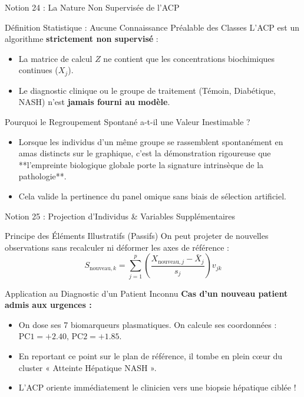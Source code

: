 \documentclass[aspectratio=169,10pt]{beamer}
\begin{document}
\begin{frame}{Notion 24 : La Nature Non Supervisée de l'ACP}
  \begin{conceptbox}{Définition Statistique : Aucune Connaissance Préalable des Classes}
    \footnotesize
    L'ACP est un algorithme \textbf{strictement non supervisé} :
    \begin{itemize}
      \item La matrice de calcul $Z$ ne contient que les concentrations biochimiques continues ($X_j$).
      \item Le diagnostic clinique ou le groupe de traitement (Témoin, Diabétique, NASH) n'est \textbf{jamais fourni au modèle}.
    \end{itemize}
  \end{conceptbox}
  \vspace{1mm}
  \begin{biobox}{Pourquoi le Regroupement Spontané a-t-il une Valeur Inestimable ?}
    \footnotesize
    \begin{itemize}
      \item Lorsque les individus d'un même groupe se rassemblent spontanément en amas distincts sur le graphique, c'est la démonstration rigoureuse que **l'empreinte biologique globale porte la signature intrinsèque de la pathologie**.
      \item Cela valide la pertinence du panel omique sans biais de sélection artificiel.
    \end{itemize}
  \end{biobox}
\end{frame}

\begin{frame}{Notion 25 : Projection d'Individus \& Variables Supplémentaires}
  \begin{conceptbox}{Principe des Éléments Illustratifs (Passifs)}
    \footnotesize
    On peut projeter de nouvelles observations sans recalculer ni déformer les axes de référence :
    \begin{equation*}
      S_{\text{nouveau}, k} = \sum_{j=1}^p \left(\frac{X_{\text{nouveau}, j} - \bar{X}_j}{s_j}\right) v_{jk}
    \end{equation*}
  \end{conceptbox}
  \vspace{1mm}
  \begin{biobox}{Application au Diagnostic d'un Patient Inconnu}
    \footnotesize
    \textbf{Cas d'un nouveau patient admis aux urgences :}
    \begin{itemize}
      \item On dose ses 7 biomarqueurs plasmatiques. On calcule ses coordonnées : $\text{PC1} = +2.40, \, \text{PC2} = +1.85$.
      \item En reportant ce point sur le plan de référence, il tombe en plein cœur du cluster « Atteinte Hépatique NASH ».
      \item L'ACP oriente immédiatement le clinicien vers une biopsie hépatique ciblée !
    \end{itemize}
  \end{biobox}
\end{frame}
\end{document}
